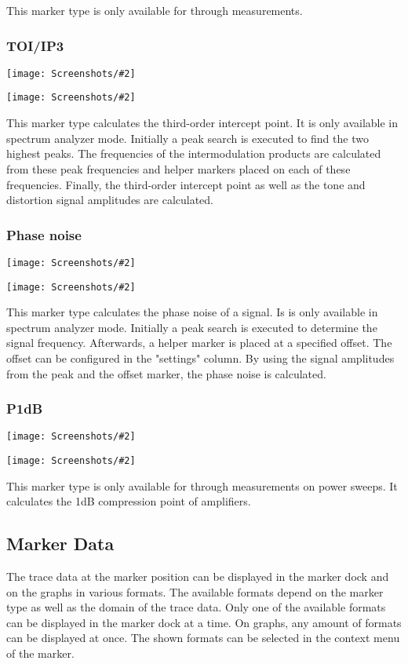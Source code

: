 \documentclass[a4paper,11pt]{article}
\newcommand{\screenshot}[2]{\begin{center}
\texttt{[image: Screenshots/\#2]}
\end{center}}
\begin{document}
This marker type is only available for through measurements.
\subsubsection{TOI/IP3}
\screenshot{1.0}{MarkerTOIGraph.png}
\screenshot{1.0}{MarkerTOITable.png}
This marker type calculates the third-order intercept point. It is only available in spectrum analyzer mode. Initially a peak search is executed to find the two highest peaks. The frequencies of the intermodulation products are calculated from these peak frequencies and helper markers placed on each of these frequencies. Finally, the third-order intercept point as well as the tone and distortion signal amplitudes are calculated.
\subsubsection{Phase noise}
\screenshot{1.0}{MarkerPhasenoiseGraph.png}
\screenshot{1.0}{MarkerPhasenoiseTable.png}
This marker type calculates the phase noise of a signal. Is is only available in spectrum analyzer mode. Initially a peak search is executed to determine the signal frequency. Afterwards, a helper marker is placed at a specified offset. The offset can be configured in the "settings" column. By using the signal amplitudes from the peak and the offset marker, the phase noise is calculated.

\subsubsection{P1dB}
\screenshot{1.0}{MarkerP1dBGraph.png}
\screenshot{1.0}{MarkerP1dBTable.png}
This marker type is only available for through measurements on power sweeps. It calculates the 1dB compression point of amplifiers.

\subsection{Marker Data}
The trace data at the marker position can be displayed in the marker dock and on the graphs in various formats. The available formats depend on the marker type as well as the domain of the trace data. Only one of the available formats can be displayed in the marker dock at a time. On graphs, any amount of formats can be displayed at once. The shown formats can be selected in the context menu of the marker.
\end{document}
